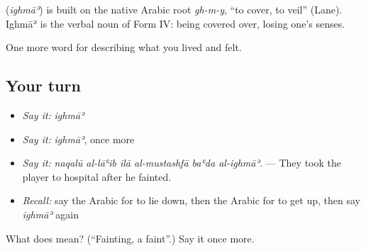 \begin{cousinweb}
\textbf{} (\emph{ighmāʾ}) is built on the native Arabic root \emph{gh-m-y}, \textquotedblleft{}to cover, to veil\textquotedblright{} (Lane). Ighmāʾ is the verbal noun of Form IV: being covered over, losing one's senses.
\end{cousinweb}

\begin{grammarlens}[title={What you've built}]
One more word for describing what you lived and felt.
\end{grammarlens}

\subsection*{Your turn}
\begin{itemize}
\raggedright
  \item \emph{Say it:} \emph{ighmāʾ}
  \item \emph{Say it:} \emph{ighmāʾ}, once more
  \item \emph{Say it:} \emph{naqalū al-lāʿib ilā al-mustashfā baʿda al-ighmāʾ.} — They took the player to hospital after he fainted.
  \item \emph{Recall:} say the Arabic for to lie down, then the Arabic for to get up, then say \emph{ighmāʾ} again
\end{itemize}

\begin{tcolorbox}[breakable,colback=teal!4,colframe=teal!35!black,title={Before you move on}]
What does  mean? (\textquotedblleft{}Fainting, a faint\textquotedblright{}.) Say it once more.
\end{tcolorbox}
